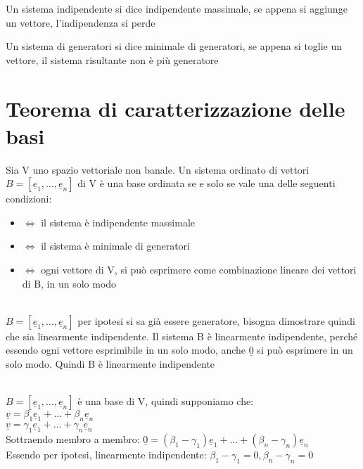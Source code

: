   \begin{nota}
    Un sistema indipendente si dice indipendente massimale, se appena
    si aggiunge un vettore, l'indipendenza si perde
  \end{nota}

  \begin{nota}
    Un sistema di generatori si dice minimale di generatori, se
    appena si toglie un vettore, il sistema risultante non è più generatore
  \end{nota}
  \section{Teorema di caratterizzazione delle basi}
  \begin{teorema}
    Sia V uno spazio vettoriale non banale. Un sistema ordinato di
    vettori $B=[\underline{e}_1,...,\underline{e}_n]$ di V è una base
    ordinata se e solo se vale una delle seguenti condizioni:
    \begin{itemize}
      \item $\Longleftrightarrow$ il sistema è indipendente massimale
      \item $\Longleftrightarrow$ il sistema è minimale di generatori
      \item $\Longleftrightarrow$ ogni vettore di V, si può esprimere
        come combinazione lineare dei vettori di B, in un solo modo
    \end{itemize}
    \begin{dimostrazione}
      \phantom{}\\
      $B=[\underline{e}_1,...,\underline{e}_n]$ per ipotesi si sa già
      essere generatore, bisogna dimostrare quindi che sia
      linearmente indipendente. Il sistema B è linearmente
      indipendente, perché essendo ogni vettore esprimibile in un
      solo modo, anche $\underline{0}$ si può esprimere in un solo
      modo. Quindi B è linearmente indipendente
    \end{dimostrazione}
    \begin{dimostrazione}
      \phantom{}\\
      $B=[\underline{e}_1,...,\underline{e}_n]$ è una base di V,
      quindi supponiamo che:\\
      $\underline{v}=\beta_1 \underline{e}_1+...+\beta_n \underline{e}_n$\\
      $\underline{v}=\gamma_1 \underline{e}_1+...+\gamma_n \underline{e}_n$\\
      Sottraendo membro a membro:
      $\underline{0}=(\beta_1-\gamma_1)\underline{e}_1+...+(\beta_n-\gamma_n)\underline{e}_n$\\
      Essendo per ipotesi, linearmente indipendente:
      $\beta_1-\gamma_1=0, \beta_n-\gamma_n=0$
    \end{dimostrazione}
  \end{teorema}

